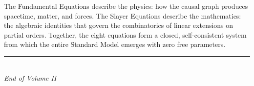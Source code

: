 \documentclass[11pt, a4paper, openany]{book}
\begin{document}
\bigskip\noindent
The Fundamental Equations describe the physics: how the causal graph
produces spacetime, matter, and forces.  The Slayer Equations describe
the mathematics: the algebraic identities that govern the combinatorics
of linear extensions on partial orders.  Together, the eight equations
form a closed, self-consistent system from which the entire Standard
Model emerges with zero free parameters.


\vspace{2cm}
\begin{center}
\rule{0.5\textwidth}{1pt}
\\ \vspace{0.5cm}
\large \textit{End of Volume II}
\end{center}

\backmatter

\end{document}
